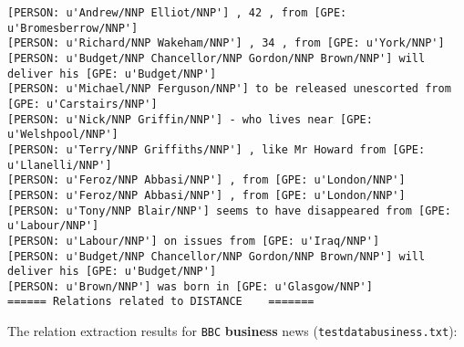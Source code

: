 \documentclass[12pt]{report}
\begin{document}
\begin{scriptsize}
\begin{verbatim}
[PERSON: u'Andrew/NNP Elliot/NNP'] , 42 , from [GPE: u'Bromesberrow/NNP']
[PERSON: u'Richard/NNP Wakeham/NNP'] , 34 , from [GPE: u'York/NNP']
[PERSON: u'Budget/NNP Chancellor/NNP Gordon/NNP Brown/NNP'] will deliver his [GPE: u'Budget/NNP']
[PERSON: u'Michael/NNP Ferguson/NNP'] to be released unescorted from [GPE: u'Carstairs/NNP']
[PERSON: u'Nick/NNP Griffin/NNP'] - who lives near [GPE: u'Welshpool/NNP']
[PERSON: u'Terry/NNP Griffiths/NNP'] , like Mr Howard from [GPE: u'Llanelli/NNP']
[PERSON: u'Feroz/NNP Abbasi/NNP'] , from [GPE: u'London/NNP']
[PERSON: u'Feroz/NNP Abbasi/NNP'] , from [GPE: u'London/NNP']
[PERSON: u'Tony/NNP Blair/NNP'] seems to have disappeared from [GPE: u'Labour/NNP']
[PERSON: u'Labour/NNP'] on issues from [GPE: u'Iraq/NNP']
[PERSON: u'Budget/NNP Chancellor/NNP Gordon/NNP Brown/NNP'] will deliver his [GPE: u'Budget/NNP']
[PERSON: u'Brown/NNP'] was born in [GPE: u'Glasgow/NNP']
====== Relations related to DISTANCE	=======
\end{verbatim}
\end{scriptsize}
\par The relation extraction results for \texttt{BBC} \textbf{business} news (\texttt{testdatabusiness.txt}):
\end{document}
